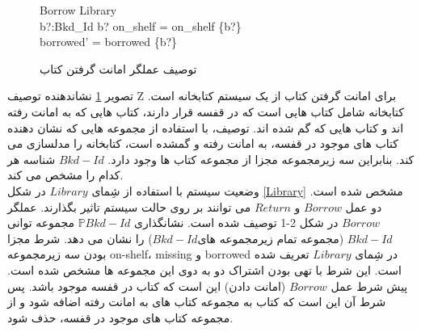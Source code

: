 \begin{figure}
\centering
\begin{schema}{Borrow}
\bigtriangleup Library\\
b?:Bkd\_Id
\where
b? \in on\_shelf = on\_shelf \hide \{b?\}\\
borrowed' = borrowed \cup \{b?\}
\end{schema}
\caption{توصیف عملگر امانت گرفتن کتاب}
\label{Borrow}
\end{figure}
تصویر \ref{Borrow} نشاندهنده توصیف Z برای امانت گرفتن کتاب از یک سیستم کتابخانه است. کتابخانه شامل کتاب هایی است که در قفسه قرار دارند، کتاب هایی که به امانت رفته اند و کتاب هایی که گم شده اند. توصیف، با استفاده از مجموعه هایی که نشان دهنده کتاب های موجود در قفسه، به امانت رفته و گمشده است، کتابخانه را مدلسازی می کند. بنابراین سه زیرمجموعه مجزا از مجموعه کتاب ها وجود دارد. $Bkd-Id$ شناسه هر کدام را مشخص می کند.
\\
وضعیت سیستم با استفاده از شِمای $Library$ در شکل \ref{Library} مشخص شده است. دو عمل $Borrow$ و $Return$ می توانند بر روی حالت سیستم تاثیر بگذارند. عملگر$ Borrow$ در شکل 2-1 توصیف شده است.
نشانگذاری $\mathbb{P} Bkd-Id$ مجموعه توانی $Bkd-Id$ (مجموعه تمام زیرمجموعه های$ Bkd-Id$) را نشان می دهد. شرط مجزا بودن سه زیرمجموعه on-shelf، missing و borrowed در شِمای $Library$ تعریف شده است. این شرط با تهی بودن اشتراک دو به دوی این مجموعه ها مشخص شده است. 
پیش شرط عمل $Borrow$ (امانت دادن) این است که کتاب در قفسه موجود باشد. پس شرط آن این است که کتاب به مجموعه کتاب های به امانت رفته اضافه شود و از مجموعه کتاب های موجود در قفسه، حذف شود.  







